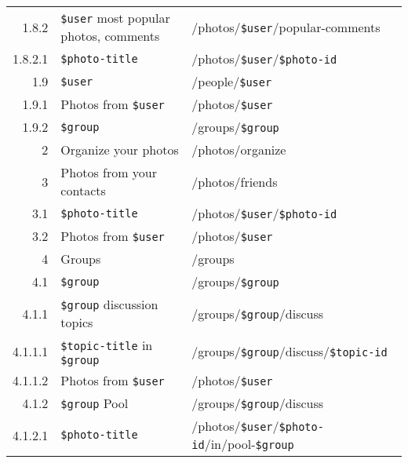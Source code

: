 \documentclass[11pt,a4paper]{article}
\newcommand{\var}[1]{\texttt{\${#1}}}
\begin{document}
\begin{center}
\begin{small}
\begin{longtable}{rp{5cm}l}
          1.8.2 &
          \var{user} most popular photos, comments &
          /photos/\var{user}/popular-comments \\

            1.8.2.1 &
            \var{photo-title} &
            /photos/\var{user}/\var{photo-id} \\

        1.9 &
        \var{user} &
        /people/\var{user} \\

          1.9.1 &
          Photos from \var{user} &
          /photos/\var{user} \\

          1.9.2 &
          \var{group} &
          /groups/\var{group} \\

      2 &
      Organize your photos &
      /photos/organize \\

      3 &
      Photos from your contacts &
      /photos/friends \\

        3.1 &
        \var{photo-title} &
        /photos/\var{user}/\var{photo-id} \\

        3.2 &
        Photos from \var{user} &
        /photos/\var{user} \\

      4 &
      Groups &
      /groups \\

        4.1 &
        \var{group} &
        /groups/\var{group} \\

          4.1.1 &
          \var{group} discussion topics &
          /groups/\var{group}/discuss \\

            4.1.1.1 &
            \var{topic-title} in \var{group} &
            /groups/\var{group}/discuss/\var{topic-id} \\

            4.1.1.2 &
            Photos from \var{user} &
            /photos/\var{user} \\

          4.1.2 &
          \var{group} Pool &
          /groups/\var{group}/discuss \\

            4.1.2.1 &
            \var{photo-title} &
            /photos/\var{user}/\var{photo-id}/in/pool-\var{group} \\


\end{longtable}
\end{small}
\end{center}
\end{document}
